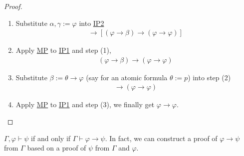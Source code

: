 \documentclass{treatise}
\begin{document}
\begin{proof} \ 
\begin{enumerate}
    \item Substitute $\alpha, \gamma := \varphi$ into \hyperref[HPL-A-IP2]{IP2}
    \begin{align*}
        [\varphi \to (\beta \to \varphi)] \to [(\varphi \to \beta) \to (\varphi \to \varphi)]
    \end{align*}
    \item Apply \hyperref[HPL-R-MP]{MP} to \hyperref[HPL-A-IP1]{IP1} and step (1),
    \begin{align*}
        (\varphi \to \beta) \to (\varphi \to \varphi)
    \end{align*}
    \item Substitute $\beta := \theta \to \varphi$ (say for an atomic formula $\theta := p$) into step (2)
    \begin{align*}
        [\varphi \to (\theta \to \varphi)] \to (\varphi \to \varphi)
    \end{align*}
    \item Apply \hyperref[HPL-R-MP]{MP} to \hyperref[HPL-A-IP1]{IP1} and step (3), we finally get $\varphi \to \varphi$.
\end{enumerate}
\end{proof}
\begin{theorem} \label{logic-deduct-metathm}
$\Gamma, \varphi \vdash \psi$ if and only if $\Gamma \vdash \varphi \to \psi$. In fact, we can construct a proof of $\varphi \to \psi$ from $\Gamma$ based on a proof of $\psi$ from $\Gamma$ and $\varphi$.
\end{theorem}
\end{document}

